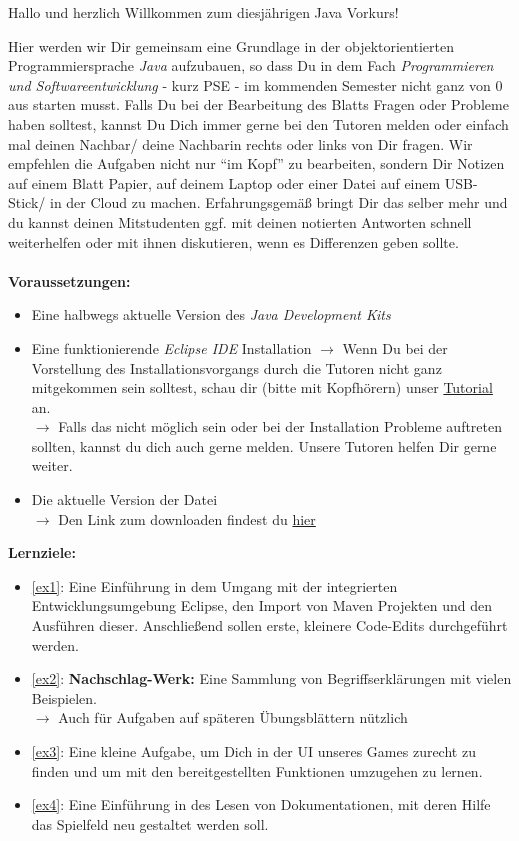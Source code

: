 
\begin{center}
	Hallo und herzlich Willkommen zum diesjährigen Java Vorkurs!\\
\end{center}
Hier werden wir Dir gemeinsam eine Grundlage in der objektorientierten Programmiersprache \textit{Java} aufzubauen, so dass Du in dem Fach \textit{Programmieren und Softwareentwicklung} - kurz PSE - im kommenden Semester nicht ganz von 0 aus starten musst.\newline
Falls Du bei der Bearbeitung des Blatts Fragen oder Probleme haben solltest, kannst Du Dich immer gerne bei den Tutoren melden oder einfach mal deinen Nachbar/ deine Nachbarin rechts oder links von Dir fragen.\newline
Wir empfehlen die Aufgaben nicht nur \enquote{im Kopf} zu bearbeiten, sondern Dir Notizen auf einem Blatt Papier, auf deinem Laptop oder einer Datei auf einem USB-Stick/ in der Cloud zu machen. Erfahrungsgemäß bringt Dir das selber mehr und du kannst deinen Mitstudenten ggf. mit deinen notierten Antworten schnell weiterhelfen oder mit ihnen diskutieren, wenn es Differenzen geben sollte.\\\\
\textbf{Voraussetzungen:}
\begin{itemize}
	\item Eine halbwegs aktuelle Version des \textit{Java Development Kits}
	\item Eine funktionierende \textit{Eclipse IDE} Installation\newline
	$\rightarrow$ Wenn Du bei der Vorstellung des Installationsvorgangs durch die Tutoren nicht ganz mitgekommen sein solltest, schau dir (bitte mit Kopfhörern) unser \href{\eclipseTutorial}{Tutorial} an.\\
	$\rightarrow$ Falls das nicht möglich sein oder bei der Installation Probleme auftreten sollten, kannst du dich auch gerne melden. Unsere Tutoren helfen Dir gerne weiter.
	\item Die aktuelle Version der \texttt{\jvkpackage} Datei\\
	$\rightarrow$ Den Link zum downloaden findest du \href{\jvkpackageurl}{hier}
\end{itemize}
\textbf{Lernziele:}
\begin{itemize}
	\item \ref{ex1}: Eine Einführung in dem Umgang mit der integrierten Entwicklungsumgebung Eclipse, den Import von Maven Projekten und den Ausführen dieser. Anschließend sollen erste, kleinere Code-Edits durchgeführt werden.
	\item \ref{ex2}: \textbf{Nachschlag-Werk:} Eine Sammlung von Begriffserklärungen mit vielen Beispielen.\\
	$\rightarrow$ Auch für Aufgaben auf späteren Übungsblättern nützlich
	\item \ref{ex3}: Eine kleine Aufgabe, um Dich in der UI unseres Games zurecht zu finden und um mit den bereitgestellten Funktionen umzugehen zu lernen.
	\item \ref{ex4}: Eine Einführung in des Lesen von Dokumentationen, mit deren Hilfe das Spielfeld neu gestaltet werden soll.
\end{itemize}